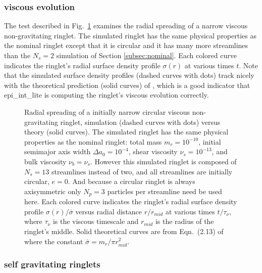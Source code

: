 \documentclass[preprint]{aastex62}
\begin{document}
\subsubsection{viscous evolution}
\label{subsubsec:viscous evolution}

The test described in Fig.\ \ref{fig:viscous_spreading}
examines the radial spreading of a narrow viscous non-gravitating ringlet.
The simulated ringlet has the same physical properties as the nominal ringlet except that it is circular and 
it has many more streamlines than the $N_s=2$ simulation of Section \ref{subsec:nominal}.
Each colored curve indicates the ringlet's radial surface density profile $\sigma(r)$ at 
various times $t$. Note that the simulated surface density profiles (dashed curves with dots)
track nicely with the theoretical prediction (solid curves) of \cite{P81}, which is a good indicator that
epi\_int\_lite is computing the ringlet's viscous evolution correctly.


\begin{figure}
    \caption{
        \label{fig:viscous_spreading}
        Radial spreading of a initially narrow circular viscous non-gravitating ringlet,
        simulation (dashed curves with dots) versus theory (solid curves).
        The simulated ringlet has the same physical properties as the nominal ringlet:
        total mass $m_r=10^{-10}$, initial semimajor axis width
        $\Delta a_0=10^{-4}$, shear viscosity $\nu_s=10^{-13}$, and bulk viscosity $\nu_b=\nu_s$.
        However this simulated ringlet is composed of $N_s=13$ streamlines instead of two, 
        and all streamlines are initially circular, $e=0$. And because a circular ringlet
        is always axisymmetric only $N_p=3$ particles per streamline need be used here. 
        Each colored curve indicates the ringlet's radial surface density profile
        $\sigma(r)/\bar{\sigma}$ versus radial distance $r/r_{mid}$ at various times $t/\tau_\nu$,
        where $\tau_\nu$ is the viscous timescale and $r_{mid}$ is the radius of the ringlet's middle.
        Solid theoretical curves are from Eqn.\ (2.13) of \cite{P81}
        where the constant $\bar{\sigma}=m_r/\pi r_{mid}^2$.
    }
\end{figure}

\subsubsection{self gravitating ringlets}
\label{subsubsec:self gravitating ringlets}
\end{document}
